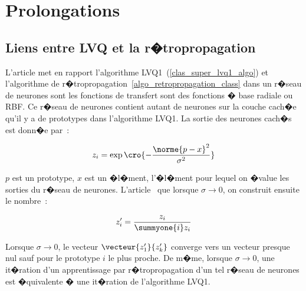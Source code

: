 \section{Prolongations}

\subsection{Liens entre LVQ et la r�tropropagation}


L'article  met en rapport l'algorithme LVQ1~(\ref{clas_super_lvq1_algo}) et l'algorithme de r�tropropagation~\ref{algo_retropropagation_class} dans un r�seau de neurones sont les fonctions de transfert sont des fonctions � base radiale ou RBF. Ce r�seau de neurones contient autant de neurones sur la couche cach�e qu'il y a de prototypes dans l'algorithme LVQ1. La sortie des neurones cach�s est donn�e par~:

                    $$
                    z_i = \exp\cro{ - \frac{\norme{p - x}^2}{\sigma^2}}
                    $$

$p$ est un prototype, $x$ est un �l�ment, l'�l�ment pour lequel on �value les sorties du r�seau de neurones. L'article~ que lorsque $\sigma \longrightarrow 0$, on construit ensuite le nombre~:

                    $$
                    z'_i = \frac{z_i}{\summyone{i}z_i}
                    $$

Lorsque $\sigma\longrightarrow 0$, le vecteur $\vecteur{z'_1}{z'_k}$ converge vers un vecteur presque nul sauf pour le prototype $i$ le plus proche. De m�me, lorsque $\sigma\longrightarrow 0$, une it�ration d'un apprentissage par r�tropropagation d'un tel r�seau de neurones est �quivalente � une it�ration de l'algorithme LVQ1.







